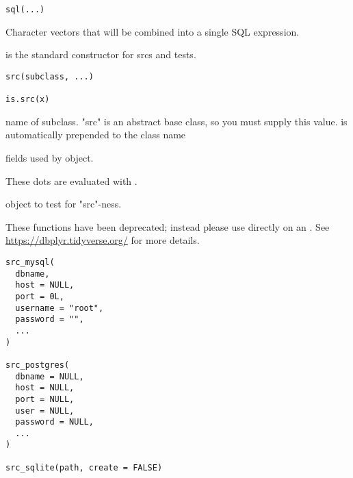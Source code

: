 \documentclass[a4paper]{book}
\begin{document}
%
\begin{Usage}
\begin{verbatim}
sql(...)
\end{verbatim}
\end{Usage}
%
\begin{Arguments}
\begin{ldescription}
\item[\code{...}] Character vectors that will be combined into a single SQL
expression.
\end{ldescription}
\end{Arguments}
%
\begin{Description}
 is the standard constructor for srcs and  tests.
\end{Description}
%
\begin{Usage}
\begin{verbatim}
src(subclass, ...)

is.src(x)
\end{verbatim}
\end{Usage}
%
\begin{Arguments}
\begin{ldescription}
\item[\code{subclass}] name of subclass. "src" is an abstract base class, so you
must supply this value.  is automatically prepended to the
class name

\item[\code{...}] fields used by object.

These dots are evaluated with .

\item[\code{x}] object to test for "src"-ness.
\end{ldescription}
\end{Arguments}
%
\begin{Description}
\strong{[Deprecated]}

These functions have been deprecated; instead please use 
directly on an . See \url{https://dbplyr.tidyverse.org/} for
more details.
\end{Description}
%
\begin{Usage}
\begin{verbatim}
src_mysql(
  dbname,
  host = NULL,
  port = 0L,
  username = "root",
  password = "",
  ...
)

src_postgres(
  dbname = NULL,
  host = NULL,
  port = NULL,
  user = NULL,
  password = NULL,
  ...
)

src_sqlite(path, create = FALSE)
\end{verbatim}
\end{Usage}
\end{document}
